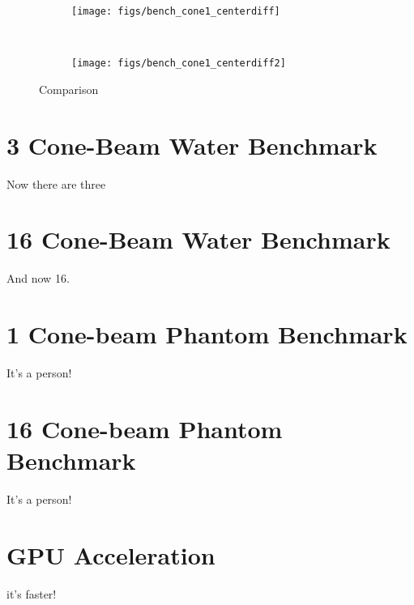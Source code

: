 \begin{figure}
    \centering
    \begin{subfigure}[b]{0.45\textwidth}
        \texttt{[image: figs/bench\_cone1\_centerdiff]}
        \caption{}
        \label{fig:bench_cone1_centerdiff}
    \end{subfigure}
    ~
    \begin{subfigure}[b]{0.45\textwidth}
        \texttt{[image: figs/bench\_cone1\_centerdiff2]}
        \caption{}
        \label{fig:bench_cone1_centerdiff2}
    \end{subfigure}
    \caption{Comparison}\label{fig:bench_cone1_centerdifffig}
\end{figure}

\section{3 Cone-Beam Water Benchmark}

Now there are three

\section{16 Cone-Beam Water Benchmark}

And now 16.

\section{1 Cone-beam Phantom Benchmark}

It's a person!

\section{16 Cone-beam Phantom Benchmark}

It's a person!

\section{GPU Acceleration}

it's faster!


\endinput
